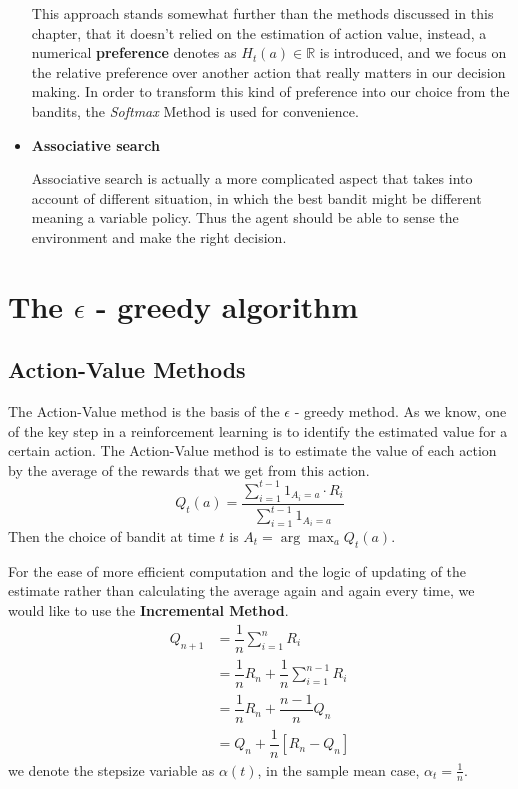 \documentclass{article}
\begin{document}
\begin{itemize}
    This approach stands somewhat further than the methods discussed in this chapter, that it doesn't relied
    on the estimation of action value, instead, a numerical \textbf{preference} denotes as $H_t(a) \in \mathbb{R}$
    is introduced, and we focus on the relative preference over another action that really matters in our 
    decision making. In order to transform this kind of preference into our choice from the bandits, the 
    \textsl{Softmax} Method is used for convenience. 

    \item \textbf{Associative search}
    
    Associative search is actually a more complicated aspect that takes into account of different situation,
    in which the best bandit might be different meaning a variable policy. Thus the agent should be able 
    to sense the environment and make the right decision.

\end{itemize}

\section{The $\epsilon$ - greedy algorithm}
\subsection{Action-Value Methods} The Action-Value method is the basis of the $\epsilon$ - greedy method. 
As we know, one of the key step in a reinforcement learning is to identify the estimated value for a certain action.
The Action-Value method is to estimate the value of each action by the average of the rewards that we get from this action.
\begin{equation}
    Q_t(a) =  \dfrac{\sum_{i=1}^{t-1}\mathrm{1}_{A_i=a}\cdot R_i}{\sum_{i=1}^{t-1}\mathrm{1}_{A_i=a}}
\end{equation}
Then the choice of bandit at time $t$ is $A_t = \arg\max_a Q_t(a)$.

For the ease of more efficient computation and the logic of updating of the estimate rather than calculating the average
again and again every time, we would like to use the \textbf{Incremental Method}.
\begin{equation}
    \begin{aligned}
        Q_{n+1} &= \dfrac{1}{n}\sum_{i=1}^{n}R_i \\
                &= \dfrac{1}{n}R_n + \dfrac{1}{n}\sum_{i=1}^{n-1}R_i \\
                &= \dfrac{1}{n}R_n + \dfrac{n-1}{n}Q_n \\
                &= Q_n + \dfrac{1}{n}[R_n-Q_n]
    \end{aligned}
\end{equation}
we denote the stepsize variable as $\alpha(t)$, in the sample mean case, $\alpha_t = \frac{1}{n}$.
\end{document}
